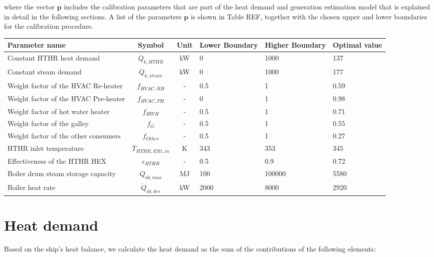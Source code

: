 \documentclass[]{article}
\begin{document}
where the vector $\textbf{p}$ includes the calibration parameters that are part of the heat demand and generation estimation model that is explained in detail in the following sections. A list of the parameters $\textbf{p}$ is shown in Table REF, together with the chosen upper and lower boundaries for the calibration procedure.
\begin{table}
	\centering
	\begin{tabular}{p{3cm}ccp{1.6cm}p{1.6cm}p{1.2cm}}
		\hline 
		Parameter name & Symbol  & Unit & Lower Boundary & Higher Boundary & Optimal value \\ 
		\hline
		Constant HTHR heat demand	 & $\dot{Q}_{k,HTHR}$ & kW & 0 & 1000 & 137 \\ 
		Constant steam demand		 & $\dot{Q}_{k,steam}$ & kW & 0 & 1000 & 177 \\
		Weight factor of the HVAC Re-heater & $f_{HVAC,RH}$ & - & 0.5 & 1 & 0.59 \\ 
		Weight factor of the HVAC Pre-heater & $f_{HVAC,PH}$ & - & 0 & 1 & 0.98 \\ 
		Weight factor of hot water heater & $f_{HWH}$ & - & 0.5 & 1 & 0.71 \\ 
		Weight factor of the galley & $f_{G}$ & - & 0.5 & 1 & 0.55 \\ 
		Weight factor of the other consumers & $f_{Other}$ & - & 0.5 & 1 & 0.27 \\ 
		HTHR inlet temperature & $T_{HTHR,ER1,in}$ & K & 343 & 353 & 345 \\
		Effectiveness of the HTHR HEX & $\epsilon_{HTHR} $ & - & 0.5 & 0.9 & 0.72 \\
		Boiler drum steam storage capacity & $Q_{ab,max}$ & MJ & 100 & 100000 & 5580 \\ 
		Boiler heat rate & $\dot{Q}_{ab,des}$ & kW & 2000 & 8000 & 2920 \\ 
		\hline
	\end{tabular} 
\end{table}



\section{Heat demand}

Based on the ship's heat balance, we calculate the heat demand as the sum of the contributions of the following elements:
\end{document}
